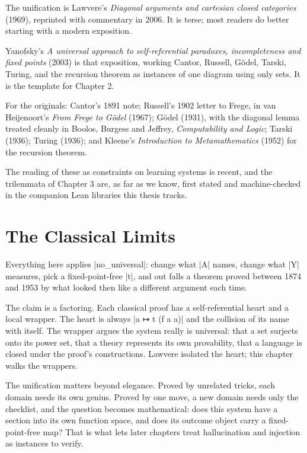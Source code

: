 \documentclass{memoir}
\begin{document}
The unification is Lawvere's \emph{Diagonal arguments and cartesian closed
categories} (1969), reprinted with commentary in 2006. It is terse; most readers
do better starting with a modern exposition.

Yanofsky's \emph{A universal approach to self-referential paradoxes, incompleteness
and fixed points} (2003) is that exposition, working Cantor, Russell, Gödel,
Tarski, Turing, and the recursion theorem as instances of one diagram using only
sets. It is the template for Chapter 2.

For the originals: Cantor's 1891 note; Russell's 1902 letter to Frege, in van
Heijenoort's \emph{From Frege to Gödel} (1967); Gödel (1931), with the diagonal lemma
treated cleanly in Boolos, Burgess and Jeffrey, \emph{Computability and Logic};
Tarski (1936); Turing (1936); and Kleene's \emph{Introduction to Metamathematics}
(1952) for the recursion theorem.

The reading of these as constraints on learning systems is recent, and the
trilemmata of Chapter 3 are, as far as we know, first stated and machine-checked
in the companion Lean libraries this thesis tracks.





\chapter{The Classical Limits}\label{Two--Schemas--of--Impossibility-005F-005F-005F--Machine--Checked--Limits--of--Trustworthy--Machine--Learning-005F-005F-005F--and--Why--They--Tighten--with--Capability----The--Classical--Limits}

Everything here applies \LeanVerb|no_universal|: change what \LeanVerb|A| names, change what
\LeanVerb|Y| measures, pick a fixed-point-free \LeanVerb|t|, and out falls a theorem proved
between 1874 and 1953 by what looked then like a different argument each time.

The claim is a factoring. Each classical proof has a self-referential heart and
a local wrapper. The heart is always \LeanVerb|a ↦ t (f a a)| and the collision of its
name with itself. The wrapper argues the system really is universal: that a set
surjects onto its power set, that a theory represents its own provability, that
a language is closed under the proof's constructions. Lawvere isolated the
heart; this chapter walks the wrappers.

The unification matters beyond elegance. Proved by unrelated tricks, each domain
needs its own genius. Proved by one move, a new domain needs only the checklist,
and the question becomes mathematical: does this system have a section into its
own function space, and does its outcome object carry a fixed-point-free map?
That is what lets later chapters treat hallucination and injection as instances
to verify.
\end{document}
